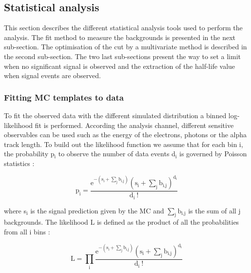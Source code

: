 \documentclass[main.tex]{subfiles}
\begin{document}
\FloatBarrier


\subsection{Statistical analysis}\label{sec:StatAnalysisTools}


\NI This section describes the different statistical analysis tools used to perform the analysis. The fit method to measure the backgrounds is presented in the next sub-section. The optimisation of the cut by a multivariate method is described in the second sub-section. The two last sub-sections present the way to set a limit when no significant signal is observed and the extraction of the half-life value when signal events are observed.


\subsubsection{Fitting MC templates to data}


\NI To fit the observed data with the different simulated distribution a binned log-likelihood fit is performed. According the analysis channel, different sensitive observables can be used such as the energy of the electrons, photons or the alpha track length. To build out the likelihood function we assume that for each bin i, the probability p$_\text{i}$ to observe the number of data events d$_\text{i}$ is governed by Poisson statistics :   

\begin{equation}
\text{p}_\text{i} = \frac {\text{e}^{-(\text{s}_\text{i}+\sum_\text{j} \text{b}_{\text{i,j}})} (\text{s}_\text{i}+ \sum_\text{j} \text{b}_{\text{i,j}})^{\text{d}_{\text{i}}} }  {\text{d}_\text{i}~\text{!}} 
\end{equation}


\bigskip


\NI where s$_\text{i}$ is the signal prediction given by the MC and $\sum_\text{j} \text{b}_{\text{i,j}}$ is the sum of all j backgrounds. The likelihood L is defined as the product of all the probabilities from all i bins : 


\begin{equation}\label{eq:likelihood}
\text{L} = \prod_\text{i} \frac {\text{e}^{-(\text{s}_\text{i}+\sum_\text{j} \text{b}_{\text{i,j}})} (\text{s}_\text{i} + \sum_\text{j} \text{b}_{\text{i,j}} )^{\text{d}_\text{i}} } {\text{d}_\text{i}~\text{!}}
\end{equation}
\end{document}
